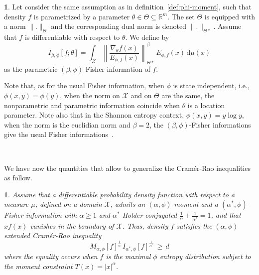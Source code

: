 \documentclass[english,sort&compress]{elsarticle}
\theoremstyle{definition}
\newtheorem{defn}{\protect\definitionname}
\theoremstyle{plain}
\newtheorem{prop}{\protect\propositionname}
\theoremstyle{plain}
\providecommand{\definitionname}{Definition}
\providecommand{\propositionname}{Proposition}
\def\dmu{\mathrm{d}\mu}
\def\Rset{\mathbb{R}}
\def\X{\mathcal{X}}
\begin{document}
\begin{defn}\label{def:p-phi-Fisher}
  Let consider  the same assumption as  in definition~\ref{def:phi-moment}, such
  that density $f$  is parametrized by a parameter  $\theta \in \Theta \subseteq
  \Rset^m$.  The set  $\Theta$ is equipped with a  norm $\|.\|_{\Theta}$ and the
  corresponding  dual norm  is denoted  $\|.\|_{\Theta*}$.  Assume  that  $f$ is
  differentiable with respect to $\theta$. We define by
  \begin{equation}\label{eq:p-phi-Fisher}
  I_{\beta,\phi}[f;\theta] = \int_\X \left\| \frac{\nabla_\theta
  f(x)}{E_{\phi,f}(x)} \right\|_{\Theta*}^\beta \, E_{\phi,f}(x) \, \dmu(x)
  \end{equation}
  as the parametric $(\beta,\phi)$-Fisher information of $f$.
\end{defn}
%
Note  that,  as  for  the   usual  Fisher  information,  when  $\phi$  is  state
independent, i.e., $\phi(x,y) = \phi(y)$, when  the norm on $\X$ and on $\Theta$
are  the  same,  the  nonparametric  and parametric  information  coincide  when
$\theta$ is a location parameter. Note also that in the Shannon entropy context,
$\phi(x,y) = y \log y$, when the norm is the euclidian norm and $\beta = 2$, the
$(\beta,\phi)$-Fisher      informations      give      the     usual      Fisher
informations~\cite{CovTho06, Fri04}.

\

We  have  now   the  quantities  that  allow  to   generalize  the  Cram\'er-Rao
inequalities as follow.
%
\begin{prop}\label{prop:np-phi-CR}
  Assume that  a differentiable probability  density function with respect  to a
  measure $\mu$, defined on a  domain $\X$, admits an $(\alpha,\phi)$-moment and
  a  $(\alpha^*,\phi)$-Fisher information  with  $\alpha \ge  1$ and  $\alpha^*$
  Holder-conjugated  $\frac{1}{\alpha} +  \frac{1}{\alpha^*} =  1$, and  that $x
  f(x)$  vanishes in  the boundary  of $\X$.   Thus, density  $f$  satisfies the
  $(\alpha,\phi)$ extended Cram\'er-Rao inequality
  \begin{equation}\label{eq:np-phi-CR}
   M_{\alpha,\phi}[f]^{\frac{1}{\alpha}} \, I_{\alpha^*\!,\phi}[f]^{\frac{1}{\alpha^*}}
   \, \ge \, d
  \end{equation}
  where the equality occurs when  $f$ is the maximal $\phi$ entropy distribution
  subject to the moment constraint $T(x) = |x|^\alpha$.
\end{prop}
\end{document}
